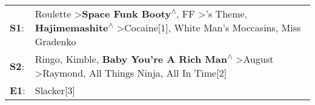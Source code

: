 \begin{supertabular}{p{0.03\textwidth}p{0.92\textwidth}}
 \textbf{S1}:  &  Roulette\textsuperscript{} \textgreater \enspace \textbf{Space Funk Booty\textsuperscript{$\wedge$}}, \enspace FF\textsuperscript{} \textgreater {}'s Theme\textsuperscript{}, \enspace \textbf{Hajimemashite\textsuperscript{$\wedge$}} \textgreater \enspace Cocaine[1]\textsuperscript{}, \enspace White Man's Moccasins\textsuperscript{}, \enspace Miss Gradenko\textsuperscript{}  \enspace  \\
 \textbf{S2}:  &                                                                             Ringo\textsuperscript{}, \enspace Kimble\textsuperscript{}, \enspace \textbf{Baby You're A Rich Man\textsuperscript{$\wedge$}} \textgreater \enspace August\textsuperscript{} \textgreater \enspace Raymond\textsuperscript{}, \enspace All Things Ninja\textsuperscript{}, \enspace All In Time[2]\textsuperscript{}  \enspace  \\
 \textbf{E1}:  &                                                                                                                                                                                                                                                                                                                                                                      Slacker[3]\textsuperscript{}  \enspace  \\
\end{supertabular}
